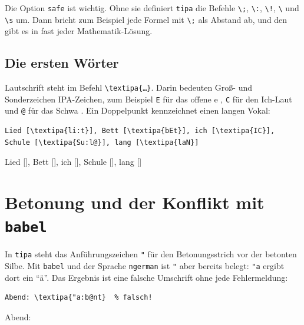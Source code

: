 Die Option \texttt{safe} ist wichtig. Ohne sie definiert \texttt{tipa} die Befehle \texttt{\textbackslash;}, \texttt{\textbackslash:}, \texttt{\textbackslash!}, \texttt{\textbackslash*} und \texttt{\textbackslash s} um. Dann bricht zum Beispiel jede Formel mit \texttt{\textbackslash;} als Abstand ab, und den gibt es in fast jeder Mathematik-Lösung.


\subsection{Die ersten Wörter}

Lautschrift steht im Befehl \texttt{\textbackslash textipa\{\dots\}}. Darin bedeuten Groß- und Sonderzeichen IPA-Zeichen, zum Beispiel \texttt{E} für das offene e , \texttt{C} für den Ich-Laut  und \texttt{@} für das Schwa . Ein Doppelpunkt kennzeichnet einen langen Vokal:

\begin{lstlisting}[style=latex]
Lied [\textipa{li:t}], Bett [\textipa{bEt}], ich [\textipa{IC}], Schule [\textipa{Su:l@}], lang [\textipa{laN}]
\end{lstlisting}

\begin{ausgabe}
	Lied [], Bett [], ich [], Schule [], lang []
\end{ausgabe}



\section{Betonung und der Konflikt mit \texttt{babel}}\label{sec:babel}

In \texttt{tipa} steht das Anführungszeichen \texttt{"} für den Betonungsstrich \textipa{\textprimstress} vor der betonten Silbe. Mit \texttt{babel} und der Sprache \texttt{ngerman} ist \texttt{"} aber bereits belegt: \texttt{"a} ergibt dort ein \enquote{ä}. Das Ergebnis ist eine falsche Umschrift ohne jede Fehlermeldung:

\begin{lstlisting}[style=latex]
Abend: \textipa{"a:b@nt}  % falsch!
\end{lstlisting}

\begin{ausgabe}
	Abend:   %
\end{ausgabe}

